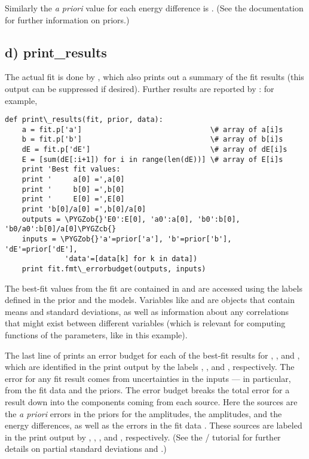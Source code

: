 \documentclass[letterpaper,10pt,english]{sphinxmanual}
\def\PYGZob{\char`\{}
\def\PYGZcb{\char`\}}
\begin{document}
Similarly the \emph{a priori} value for each energy difference is .
(See the  documentation for further information on priors.)


\subsection{d) print\_results}
\label{corrfitter:d-print-results}
The actual fit is done by , which also prints out
a summary of the fit results (this output can be suppressed if desired).
Further results are reported by : for
example,

\begin{Verbatim}[commandchars=\\\{\}]
def print\_results(fit, prior, data):
    a = fit.p['a']                              \# array of a[i]s
    b = fit.p['b']                              \# array of b[i]s
    dE = fit.p['dE']                            \# array of dE[i]s
    E = [sum(dE[:i+1]) for i in range(len(dE))] \# array of E[i]s
    print 'Best fit values:
    print '     a[0] =',a[0]
    print '     b[0] =',b[0]
    print '     E[0] =',E[0]
    print 'b[0]/a[0] =',b[0]/a[0]
    outputs = \PYGZob{}'E0':E[0], 'a0':a[0], 'b0':b[0], 'b0/a0':b[0]/a[0]\PYGZcb{}
    inputs = \PYGZob{}'a'=prior['a'], 'b'=prior['b'], 'dE'=prior['dE'],
              'data'=[data[k] for k in data])
    print fit.fmt\_errorbudget(outputs, inputs)
\end{Verbatim}

The best-fit values from the fit are contained in  and are accessed
using the labels defined in the prior and the {\hyperref[corrfitter:corrfitter.Corr2]{}} models. Variables like
 and  are  objects that contain means and standard
deviations, as well as information about any correlations that might exist
between different variables (which is relevant for computing functions of the
parameters, like  in this example).

The last line of  prints an error budget for
each of the best-fit results for , ,  and
, which are identified in the print output by the labels
, ,  and , respectively. The error for any
fit result comes from uncertainties in the inputs --- in particular, from the
fit data and the priors. The error budget breaks the total error for a
result down into the components coming from each source. Here the sources are
the \emph{a priori} errors in the priors for the  amplitudes, the 
amplitudes, and the  energy differences, as well as the errors in
the fit data . These sources are labeled in the print output by
, , , and , respectively. (See the
/ tutorial for further details on partial standard
deviations and .)
\end{document}
